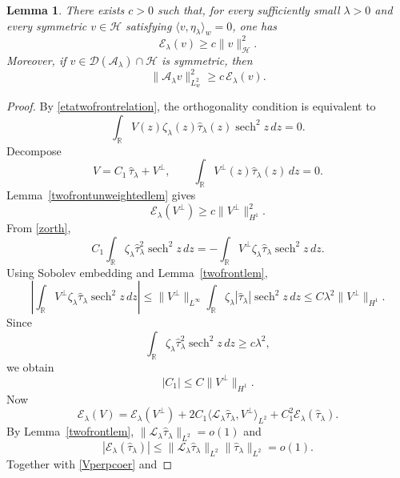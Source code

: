 \documentclass[11pt,a4paper]{article}
\DeclareMathOperator{\sech}{sech}
\numberwithin{equation}{section}
\theoremstyle{plain}
\newtheorem{lemma}[theorem]{Lemma}
\theoremstyle{remark}
\begin{document}
\begin{lemma}\label{etacoercivity}
There exists $c>0$ such that, for every sufficiently small
$\lambda>0$ and every symmetric $v\in\mathcal H$ satisfying $\langle v,\eta_\lambda\rangle_w=0$, one has
\begin{equation}\label{Hcoereq}
\mathcal E_\lambda(v)
\geq
c\|v\|_{\mathcal H}^2.
\end{equation}
Moreover, if $v\in\mathcal D(\mathcal A_\lambda)\cap\mathcal H$ is symmetric,
then
\begin{equation}\label{reversecoer}
\|\mathcal A_\lambda v\|_{L_w^2}^2
\geq
c\,\mathcal E_\lambda(v).
\end{equation}
\end{lemma}
\begin{proof}
By \eqref{etatwofrontrelation}, the orthogonality condition is equivalent
to
\begin{equation}\label{zorth}
\int_{\mathbb R}
V(z)\zeta_\lambda(z)\widehat{\tau}_\lambda(z)\sech^2z\,dz
=
0.
\end{equation}
Decompose
$$
V=C_1\,\widehat{\tau}_\lambda+V^\perp,
\qquad
\int_{\mathbb R}V^\perp(z)\widehat{\tau}_\lambda(z)\,dz=0.
$$
Lemma~\ref{twofrontunweightedlem} gives
\begin{equation}\label{Vperpcoer}
\mathcal E_\lambda(V^\perp)
\geq
c\|V^\perp\|_{H^1}^2.
\end{equation}
From \eqref{zorth},
$$
C_1
\int_{\mathbb R}
\zeta_\lambda \widehat{\tau}_\lambda^2\sech^2z\,dz
=
-
\int_{\mathbb R}
V^\perp\zeta_\lambda \widehat{\tau}_\lambda\sech^2z\,dz.
$$
Using Sobolev embedding and
Lemma~\ref{twofrontlem},
$$
\left|
\int_{\mathbb R}
V^\perp\zeta_\lambda \widehat{\tau}_\lambda\sech^2z\,dz
\right|
\leq
\|V^\perp\|_{L^\infty}
\int_{\mathbb R}
\zeta_\lambda|\widehat{\tau}_\lambda|\sech^2z\,dz
\leq
C\lambda^2\|V^\perp\|_{H^1}.
$$
Since
$$
\int_{\mathbb R}
\zeta_\lambda \widehat{\tau}_\lambda^2\sech^2z\,dz
\geq
c\lambda^2,
$$
we obtain
\begin{equation}\label{ccontrolled}
|C_1|
\leq
C\|V^\perp\|_{H^1}.
\end{equation}
Now
$$
\mathcal E_\lambda(V)
=
\mathcal E_\lambda(V^\perp)
+
2C_1
\langle\mathscr L_\lambda \widehat{\tau}_\lambda,V^\perp\rangle_{L^2}
+
C_1^2\mathcal E_\lambda(\widehat{\tau}_\lambda).
$$
By Lemma~\ref{twofrontlem}, $\|\mathscr L_\lambda \widehat{\tau}_\lambda\|_{L^2}=o(1)$ and
$$
|\mathcal E_\lambda(\widehat{\tau}_\lambda)|
\leq
\|\mathscr L_\lambda \widehat{\tau}_\lambda\|_{L^2}
\|\widehat{\tau}_\lambda\|_{L^2}
=
o(1).
$$
Together with \eqref{Vperpcoer} and

\end{proof}
\end{document}
